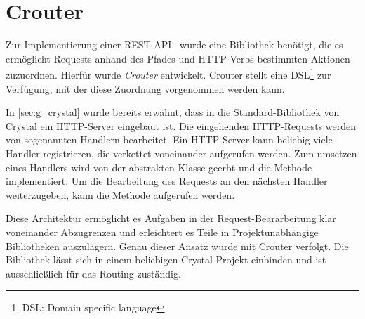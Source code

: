 \section{Crouter}
\label{sec:b_crouter}

Zur Implementierung einer REST-API~\cite{rest} wurde eine Bibliothek benötigt,
die es ermöglicht Requests anhand des Pfades und HTTP-Verbs bestimmten Aktionen
zuzuordnen.  Hierfür wurde \emph{Crouter} entwickelt.  Crouter stellt eine
DSL\footnote{DSL: Domain specific language} zur Verfügung, mit der diese
Zuordnung vorgenommen werden kann.

In \cref{sec:g_crystal} wurde bereits erwähnt, dass in die Standard-Bibliothek
von Crystal ein HTTP-Server eingebaut ist.  Die eingehenden HTTP-Requests
werden von sogenannten Handlern bearbeitet.  Ein HTTP-Server kann beliebig
viele Handler registrieren, die verkettet voneinander aufgerufen werden.  Zum
umsetzen eines Handlers wird von der abstrakten Klasse 
geerbt und die Methode  implementiert.  Um die Bearbeitung
des Requests an den nächsten Handler weiterzugeben, kann die Methode
 aufgerufen werden.

Diese Architektur ermöglicht es Aufgaben in der
Request-Beararbeitung klar voneinander Abzugrenzen und erleichtert es Teile in
Projektunabhängige Bibliotheken auszulagern.  Genau dieser Ansatz wurde mit
Crouter verfolgt.  Die Bibliothek lässt sich in einem beliebigen
Crystal-Projekt einbinden und ist ausschließlich für das Routing zuständig.




